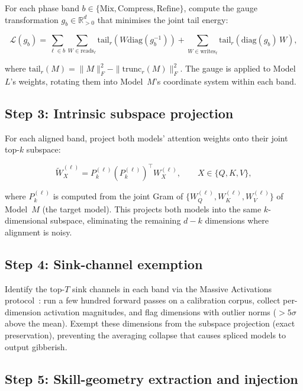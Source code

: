 \documentclass[11pt]{article}
\begin{document}
For each phase band $b \in \{\mathrm{Mix}, \mathrm{Compress},
\mathrm{Refine}\}$, compute the gauge transformation
$g_b \in \mathbb{R}^d_{>0}$ that minimises the joint tail energy:

\begin{equation}
\mathcal{L}(g_b) = \sum_{\ell \in b} \sum_{W \in \mathrm{reads}_\ell}
\mathrm{tail}_r(W \mathrm{diag}(g_b^{-1})) +
\sum_{W \in \mathrm{writes}_\ell}
\mathrm{tail}_r(\mathrm{diag}(g_b)\,W),
\label{eq:gauge-loss}
\end{equation}

where $\mathrm{tail}_r(M) = \|M\|_F^2 - \|\mathrm{trunc}_r(M)\|_F^2$.
The gauge is applied to Model~$L$'s weights, rotating them into
Model~$M$'s coordinate system within each band.

\subsection{Step 3: Intrinsic subspace projection}

For each aligned band, project both models' attention weights onto
their joint top-$k$ subspace:

\begin{equation}
\tilde W_X^{(\ell)} = P_k^{(\ell)} (P_k^{(\ell)})^\top W_X^{(\ell)},
\qquad X \in \{Q,K,V\},
\label{eq:project}
\end{equation}

where $P_k^{(\ell)}$ is computed from the joint Gram of
$\{W_Q^{(\ell)}, W_K^{(\ell)}, W_V^{(\ell)}\}$ of Model~$M$
(the target model). This projects both models into the same
$k$-dimensional subspace, eliminating the remaining $d-k$ dimensions
where alignment is noisy.

\subsection{Step 4: Sink-channel exemption}

Identify the top-$T$ sink channels in each band via the Massive
Activations protocol~\cite{sun2024massive}: run a few hundred forward
passes on a calibration corpus, collect per-dimension activation
magnitudes, and flag dimensions with outlier norms ($>5\sigma$ above
the mean). Exempt these dimensions from the subspace projection
(exact preservation), preventing the averaging collapse that causes
spliced models to output gibberish.

\subsection{Step 5: Skill-geometry extraction and injection}
\end{document}
